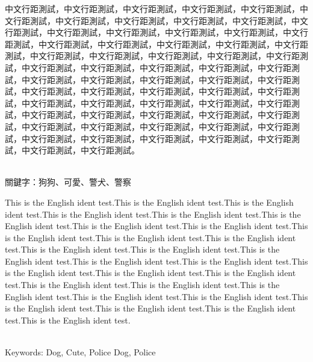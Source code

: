 




\begin{abstractzh}
中文行距測試，中文行距測試，中文行距測試，中文行距測試，中文行距測試，中文行距測試，中文行距測試，中文行距測試，中文行距測試，中文行距測試，中文行距測試，中文行距測試，中文行距測試，中文行距測試，中文行距測試，中文行距測試，中文行距測試，中文行距測試，中文行距測試，中文行距測試，中文行距測試，中文行距測試，中文行距測試，中文行距測試，中文行距測試，中文行距測試，中文行距測試，中文行距測試，中文行距測試，中文行距測試，中文行距測試，中文行距測試，中文行距測試，中文行距測試，中文行距測試，中文行距測試，中文行距測試，中文行距測試，中文行距測試，中文行距測試，中文行距測試，中文行距測試，中文行距測試，中文行距測試，中文行距測試，中文行距測試，中文行距測試，中文行距測試，中文行距測試，中文行距測試，中文行距測試，中文行距測試，中文行距測試，中文行距測試，中文行距測試，中文行距測試，中文行距測試，中文行距測試，中文行距測試，中文行距測試，中文行距測試，中文行距測試，中文行距測試。


~\\
\noindent
關鍵字：狗狗、可愛、警犬、警察
\end{abstractzh}

\begin{abstracten}
\begin{small}
This is the English ident test.This is the English ident test.This is the English ident test.This is the English ident test.This is the English ident test.This is the English ident test.This is the English ident test.This is the English ident test.This is the English ident test.This is the English ident test.This is the English ident test.This is the English ident test.This is the English ident test.This is the English ident test.This is the English ident test.This is the English ident test.This is the English ident test.This is the English ident test.This is the English ident test.This is the English ident test.This is the English ident test.This is the English ident test.This is the English ident test.This is the English ident test.This is the English ident test.This is the English ident test.This is the English ident test.This is the English ident test. 

~\\
\noindent
Keywords: Dog, Cute, Police Dog, Police
\end{small}
\end{abstracten}
